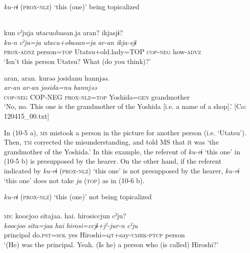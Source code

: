 \ea\label{ex:10.5}   \textit{ku-rɨ} (\textsc{prox}-\textsc{nlz}) ‘this (one)’ being topicalized\\\\
  \begin{xlist}[b. \textsc{tm}:]
   \glll kun  cˀjuja  utacuobasan.ja  aran?  ikjasjɨ?\\
      \textit{ku-n}  \textit{cˀju=ja}  \textit{utacu+obasan=ja}  \textit{ar-an}  \textit{ikja-sjɨ}\\
      \textsc{prox}-\textsc{adnz}  person=\textsc{top}  Utatsu+old.lady=TOP  \textsc{cop}-\textsc{neg}  how-\textsc{advz}\\
      \glt ‘Isn’t this person Utatsu? What (do you think)?’

    \glll    aran,  aran.  kurəə  josidanu  hannjəə.\\
      \textit{ar-an}  \textit{ar-an}  \textit{}  \textit{josida=nu}  \textit{hannjəə}\\
      \textsc{cop}-\textsc{neg}  COP-NEG  \textsc{prox}-\textsc{nlz}=\textsc{top}  Yoshida=\textsc{gen}  grandmother\\
      \glt       ‘No, no. This one is the grandmother of the Yoshida [i.e. a name of a shop].’ [Co: 120415\_00.txt]
  \end{xlist}
\z

In (10-5 a), \textsc{ms} mistook a person in the picture for another person (i.e. ‘Utatsu’). Then, \textsc{tm} corrected the misunderstanding, and told MS that it was ‘the grandmother of the Yoshida.’ In this example, the referent of \textit{ku-rɨ} ‘this one’ in (10-5 b) is presupposed by the hearer. On the other hand, if the referent indicated by \textit{ku-rɨ} (\textsc{prox}-\textsc{nlz}) ‘this one’ is not presupposed by the hearer, \textit{ku-rɨ} ‘this one’ does not take \textit{ja} (\textsc{top}) as in (10-6 b).

\ea\label{ex:10.6}   \textit{ku-rɨ} (\textsc{prox}-\textsc{nlz}) ‘this (one)’ not being topicalized\\\\
  \ea \textsc{ms}: \glll {\textbar}koocjoo  sita{\textbar}jaa.  {\textbar}hai{\textbar}.  hirosiccjun  cˀju?\\
      \textit{koocjoo}  \textit{sita=jaa}  \textit{hai}  \textit{hirosi=ccjɨ+jˀ-jur-n}  \textit{cˀju}\\
      principal  do.\textsc{pst}=\textsc{sol}  yes  Hiroshi=\textsc{qt}+say-\textsc{umrk}-\textsc{ptcp}  person\\
      \glt ‘(He) was the principal. Yeah. (Is he) a person who (is called) Hiroshi?’

